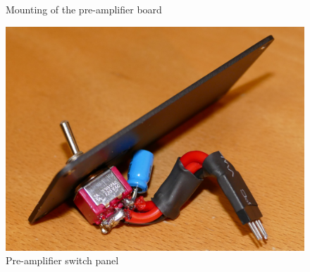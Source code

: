 \documentclass[a4paper]{article}
\begin{document}
\begin{appendices}
\begin{figure}[ht!]
\centering
{}
\caption{Mounting of the pre-amplifier board}
\label{fig:pre_amp_mounting}
\end{figure}

\begin{figure}[ht!]
\centering
\includegraphics[width=\textwidth]{fig/P1170907-cropped.jpg}
\caption{Pre-amplifier switch panel}
\label{fig:pre_amp_switch}
\end{figure}


\end{appendices}
\end{document}
